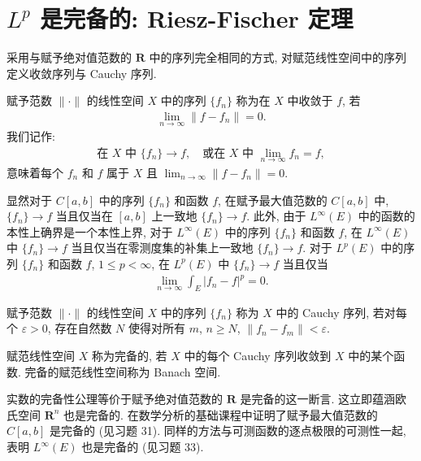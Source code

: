 \documentclass[../../main.tex]{subfiles}
\begin{document}
\section{$L^{p}$ 是完备的: Riesz-Fischer 定理}\label{section:ch07-Riesz-Fischer}

采用与赋予绝对值范数的 $\mathbf{R}$ 中的序列完全相同的方式, 对赋范线性空间中的序列定义收敛序列与 Cauchy 序列.

\begin{definition}\label{definition:ch07-收敛与Cauchy}
赋予范数 $\|\cdot\|$ 的线性空间 $X$ 中的序列 $\{f_{n}\}$ 称为在 $X$ 中收敛于 $f$, 若
\begin{align*}
\lim_{n\to\infty}\|f-f_{n}\|=0.
\end{align*}
我们记作:
\begin{align*}
\text{在 }X\text{ 中 }\{f_{n}\}\to f,\quad\text{或在 }X\text{ 中 }\lim_{n\to\infty}f_{n}=f,
\end{align*}
意味着每个 $f_{n}$ 和 $f$ 属于 $X$ 且 $\lim_{n\to\infty}\|f-f_{n}\|=0$.
\end{definition}

显然对于 $C[a,b]$ 中的序列 $\{f_{n}\}$ 和函数 $f$, 在赋予最大值范数的 $C[a,b]$ 中, $\{f_{n}\}\to f$ 当且仅当在 $[a,b]$ 上一致地 $\{f_{n}\}\to f$. 此外, 由于 $L^{\infty}(E)$ 中的函数的本性上确界是一个本性上界, 对于 $L^{\infty}(E)$ 中的序列 $\{f_{n}\}$ 和函数 $f$, 在 $L^{\infty}(E)$ 中 $\{f_{n}\}\to f$ 当且仅当在零测度集的补集上一致地 $\{f_{n}\}\to f$. 对于 $L^{p}(E)$ 中的序列 $\{f_{n}\}$ 和函数 $f$, $1\leqslant p<\infty$, 在 $L^{p}(E)$ 中 $\{f_{n}\}\to f$ 当且仅当
\begin{align*}
\lim_{n\to\infty}\int_{E}|f_{n}-f|^{p}=0.
\end{align*}

\begin{definition}\label{definition:ch07-Cauchy与Banach}
赋予范数 $\|\cdot\|$ 的线性空间 $X$ 中的序列 $\{f_{n}\}$ 称为 $X$ 中的 Cauchy 序列, 若对每个 $\varepsilon>0$, 存在自然数 $N$ 使得对所有 $m$, $n\geqslant N$, $\|f_{n}-f_{m}\|<\varepsilon$.

赋范线性空间 $X$ 称为完备的, 若 $X$ 中的每个 Cauchy 序列收敛到 $X$ 中的某个函数. 完备的赋范线性空间称为 Banach 空间.
\end{definition}

实数的完备性公理等价于赋予绝对值范数的 $\mathbf{R}$ 是完备的这一断言. 这立即蕴涵欧氏空间 $\mathbf{R}^{n}$ 也是完备的. 在数学分析的基础课程中证明了赋予最大值范数的 $C[a,b]$ 是完备的 (见习题 31). 同样的方法与可测函数的逐点极限的可测性一起, 表明 $L^{\infty}(E)$ 也是完备的 (见习题 33).
\end{document}
